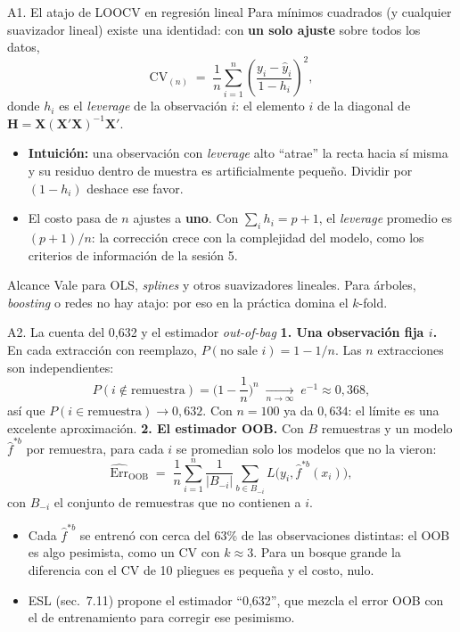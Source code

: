 \documentclass{beamer}
\newcommand{\1}{\mathbb{I}}
\begin{document}
\begin{frame}{A1. El atajo de LOOCV en regresión lineal}
\small
Para mínimos cuadrados (y cualquier suavizador lineal) existe una identidad: con \textbf{un solo ajuste} sobre todos los datos,
\[ \mathrm{CV}_{(n)} \;=\; \frac{1}{n} \sum_{i=1}^{n} \left( \frac{y_i - \hat{y}_i}{1 - h_i} \right)^2, \]
donde $h_i$ es el \emph{leverage} de la observación $i$: el elemento $i$ de la diagonal de $\mathbf{H} = \mathbf{X}(\mathbf{X}'\mathbf{X})^{-1}\mathbf{X}'$.
\pause
\vspace{0.1cm}
\begin{itemize}\itemsep4pt
  \item \textbf{Intuición:} una observación con \emph{leverage} alto ``atrae'' la recta hacia sí misma y su residuo dentro de muestra es artificialmente pequeño. Dividir por $(1 - h_i)$ deshace ese favor.
  \item El costo pasa de $n$ ajustes a \textbf{uno}. Con $\sum_i h_i = p + 1$, el \emph{leverage} promedio es $(p+1)/n$: la corrección crece con la complejidad del modelo, como los criterios de información de la sesión 5.
\end{itemize}
\pause
\begin{block}{Alcance}
Vale para OLS, \emph{splines} y otros suavizadores lineales. Para árboles, \emph{boosting} o redes no hay atajo: por eso en la práctica domina el $k$-fold.
\end{block}
\end{frame}

\begin{frame}{A2. La cuenta del 0,632 y el estimador \emph{out-of-bag}}
\small
\textbf{1. Una observación fija $i$.} En cada extracción con reemplazo, $P(\text{no sale } i) = 1 - 1/n$. Las $n$ extracciones son independientes:
\[ P(i \notin \text{remuestra}) = \Big(1 - \frac{1}{n}\Big)^{n} \;\xrightarrow[n \to \infty]{}\; e^{-1} \approx 0{,}368, \]
así que $P(i \in \text{remuestra}) \to 0{,}632$. Con $n = 100$ ya da $0{,}634$: el límite es una excelente aproximación.
\pause
\vspace{0.1cm}
\textbf{2. El estimador OOB.} Con $B$ remuestras y un modelo $\hat{f}^{*b}$ por remuestra, para cada $i$ se promedian solo los modelos que no la vieron:
\[ \widehat{\mathrm{Err}}_{\text{OOB}} \;=\; \frac{1}{n}\sum_{i=1}^{n} \frac{1}{|B_{-i}|} \sum_{b \in B_{-i}} L\big(y_i, \hat{f}^{*b}(x_i)\big), \]
con $B_{-i}$ el conjunto de remuestras que no contienen a $i$.
\pause
\begin{itemize}\itemsep3pt
  \item Cada $\hat{f}^{*b}$ se entrenó con cerca del 63\% de las observaciones distintas: el OOB es algo pesimista, como un CV con $k \approx 3$. Para un bosque grande la diferencia con el CV de 10 pliegues es pequeña y el costo, nulo.
  \item ESL (sec.\ 7.11) propone el estimador ``0,632'', que mezcla el error OOB con el de entrenamiento para corregir ese pesimismo.
\end{itemize}
\end{frame}
\end{document}
